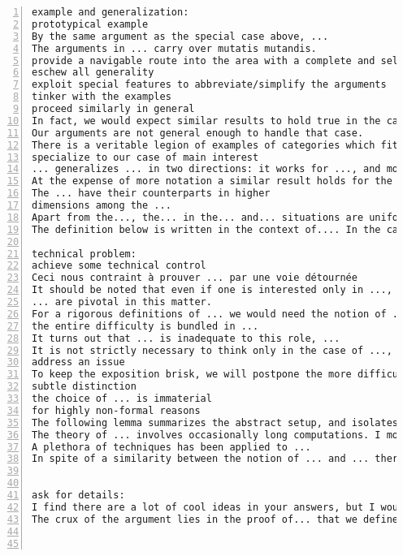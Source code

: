 \documentclass[11pt]{amsart}
\begin{document}
\begin{lstlisting}[numbers=left,numberstyle=\tiny,numbersep=10pt]
example and generalization:
prototypical example
By the same argument as the special case above, ...
The arguments in ... carry over mutatis mutandis.
provide a navigable route into the area with a complete and self-contained account of the case ...
eschew all generality
exploit special features to abbreviate/simplify the arguments
tinker with the examples
proceed similarly in general
In fact, we would expect similar results to hold true in the case where ...
Our arguments are not general enough to handle that case.
There is a veritable legion of examples of categories which fit this paradigm:...
specialize to our case of main interest
... generalizes ... in two directions: it works for ..., and moreover it deals with ... instead of ...
At the expense of more notation a similar result holds for the other...
The ... have their counterparts in higher
dimensions among the ...
Apart from the..., the... in the... and... situations are uniform.
The definition below is written in the context of.... In the case of..., one has to replace... with....

technical problem:
achieve some technical control
Ceci nous contraint à prouver ... par une voie détournée
It should be noted that even if one is interested only in ..., the proofs often involve more general ...
... are pivotal in this matter.
For a rigorous definitions of ... we would need the notion of ..., which would take us too far away from the subject of ...
the entire difficulty is bundled in ...
It turns out that ... is inadequate to this role, ...
It is not strictly necessary to think only in the case of ..., but it certainly allows one to ignore some technical difficulties.
address an issue
To keep the exposition brisk, we will postpone the more difficult proofs until ...
subtle distinction
the choice of ... is immaterial
for highly non-formal reasons
The following lemma summarizes the abstract setup, and isolates the key property that we need to prove in our situation.
The theory of ... involves occasionally long computations. I moved several of them to the end of .... The reader may want to do some of them as exercises without looking first at these appendices.
A plethora of techniques has been applied to ...
In spite of a similarity between the notion of ... and ... there are essential differences.


ask for details:
I find there are a lot of cool ideas in your answers, but I would be grateful if you could be a bit more precise.
The crux of the argument lies in the proof of... that we define in more detail now.



\end{lstlisting}
\end{document}
